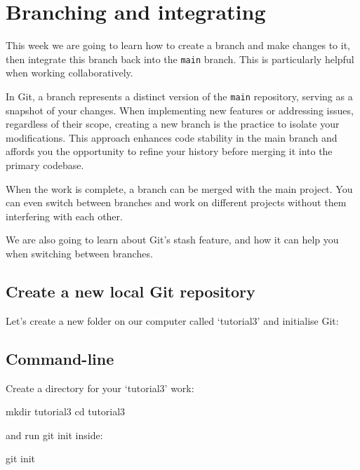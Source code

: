 \documentclass[
  letterpaper,
  DIV=11,
  numbers=noendperiod]{scrartcl}
\newenvironment{Shaded}{\begin{snugshade}}{\end{snugshade}}
\newcommand{\NormalTok}[1]{\textcolor[rgb]{0.00,0.23,0.31}{#1}}
\begin{document}
\section{Branching and integrating}\label{branching-and-integrating}

This week we are going to learn how to create a branch and make changes
to it, then integrate this branch back into the \texttt{main} branch.
This is particularly helpful when working collaboratively.

In Git, a branch represents a distinct version of the \texttt{main}
repository, serving as a snapshot of your changes. When implementing new
features or addressing issues, regardless of their scope, creating a new
branch is the practice to isolate your modifications. This approach
enhances code stability in the main branch and affords you the
opportunity to refine your history before merging it into the primary
codebase.

When the work is complete, a branch can be merged with the main project.
You can even switch between branches and work on different projects
without them interfering with each other.

We are also going to learn about Git's stash feature, and how it can
help you when switching between branches.

\subsection{Create a new local Git
repository}\label{create-a-new-local-git-repository}

Let's create a new folder on our computer called `tutorial3' and
initialise Git:

\subsection{Command-line}

Create a directory for your `tutorial3' work:

\begin{Shaded}
\begin{Highlighting}[]
\NormalTok{mkdir tutorial3}
\NormalTok{cd tutorial3}
\end{Highlighting}
\end{Shaded}

and run git init inside:

\begin{Shaded}
\begin{Highlighting}[]
\NormalTok{git init}
\end{Highlighting}
\end{Shaded}
\end{document}
